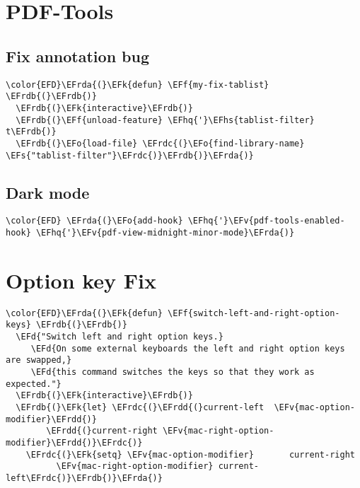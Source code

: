 \documentclass[c]{article}
\theoremstyle{plain}%
\theoremstyle{definition}
\theoremstyle{remark}
\newcommand{\EFs}[1]{\textcolor{EFs}{#1}} %
\newcommand{\EFd}[1]{\textcolor{EFd}{#1}} %
\newcommand{\EFk}[1]{\textcolor{EFk}{#1}} %
\newcommand{\EFf}[1]{\textcolor{EFf}{#1}} %
\newcommand{\EFv}[1]{\textcolor{EFv}{#1}} %
\newcommand{\EFo}[1]{\textcolor{EFo}{#1}} %
\newcommand{\EFhq}[1]{\textcolor{EFhq}{#1}} %
\newcommand{\EFhs}[1]{\textcolor{EFhs}{#1}} %
\newcommand{\EFrda}[1]{\textcolor{EFrda}{#1}} %
\newcommand{\EFrdb}[1]{\textcolor{EFrdb}{#1}} %
\newcommand{\EFrdc}[1]{\textcolor{EFrdc}{#1}} %
\newcommand{\EFrdd}[1]{\textcolor{EFrdd}{#1}} %
\begin{document}
\section{PDF-Tools}
\label{sec:org9114e7c}
\subsection{Fix annotation bug}
\label{sec:org231b803}
\begin{Code}
\begin{Verbatim}
\color{EFD}\EFrda{(}\EFk{defun} \EFf{my-fix-tablist} \EFrdb{(}\EFrdb{)}
  \EFrdb{(}\EFk{interactive}\EFrdb{)}
  \EFrdb{(}\EFf{unload-feature} \EFhq{'}\EFhs{tablist-filter} t\EFrdb{)}
  \EFrdb{(}\EFo{load-file} \EFrdc{(}\EFo{find-library-name} \EFs{"tablist-filter"}\EFrdc{)}\EFrdb{)}\EFrda{)}
\end{Verbatim}
\end{Code}
\subsection{Dark mode}
\label{sec:org0204783}
\begin{Code}
\begin{Verbatim}
\color{EFD} \EFrda{(}\EFo{add-hook} \EFhq{'}\EFv{pdf-tools-enabled-hook} \EFhq{'}\EFv{pdf-view-midnight-minor-mode}\EFrda{)}
\end{Verbatim}
\end{Code}
\section{Option key Fix}
\label{sec:orgd5a2562}
\begin{Code}
\begin{Verbatim}
\color{EFD}\EFrda{(}\EFk{defun} \EFf{switch-left-and-right-option-keys} \EFrdb{(}\EFrdb{)}
  \EFd{"Switch left and right option keys.}
     \EFd{On some external keyboards the left and right option keys are swapped,}
     \EFd{this command switches the keys so that they work as expected."}
  \EFrdb{(}\EFk{interactive}\EFrdb{)}
  \EFrdb{(}\EFk{let} \EFrdc{(}\EFrdd{(}current-left  \EFv{mac-option-modifier}\EFrdd{)}
        \EFrdd{(}current-right \EFv{mac-right-option-modifier}\EFrdd{)}\EFrdc{)}
    \EFrdc{(}\EFk{setq} \EFv{mac-option-modifier}       current-right
          \EFv{mac-right-option-modifier} current-left\EFrdc{)}\EFrdb{)}\EFrda{)}
\end{Verbatim}
\end{Code}
\end{document}
